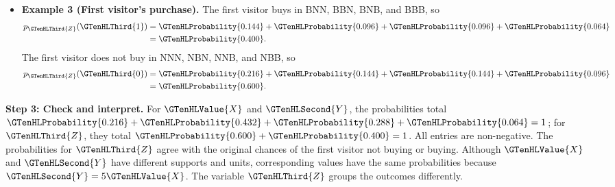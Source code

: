 \begin{itemize}
	\item \textbf{Example 3 (First visitor's purchase).}
	The first visitor buys in BNN, BBN, BNB, and BBB, so
	\[
	\begin{aligned}
		p_{\GTenHLThird{Z}}(\GTenHLThird{1})
		&=\GTenHLProbability{0.144}+\GTenHLProbability{0.096}+\GTenHLProbability{0.096}+\GTenHLProbability{0.064}\\
		&=\GTenHLProbability{0.400}.
	\end{aligned}
	\]
	The first visitor does not buy in NNN, NBN, NNB,
	and NBB, so
	\[
	\begin{aligned}
		p_{\GTenHLThird{Z}}(\GTenHLThird{0})
		&=\GTenHLProbability{0.216}+\GTenHLProbability{0.144}+\GTenHLProbability{0.144}+\GTenHLProbability{0.096}\\
		&=\GTenHLProbability{0.600}.
	\end{aligned}
	\]
\end{itemize}

\textbf{Step 3: Check and interpret.} For $\GTenHLValue{X}$ and $\GTenHLSecond{Y}$, the probabilities total $\GTenHLProbability{0.216}+\GTenHLProbability{0.432}+\GTenHLProbability{0.288}+\GTenHLProbability{0.064}=1$; for $\GTenHLThird{Z}$, they total $\GTenHLProbability{0.600}+\GTenHLProbability{0.400}=1$. All entries are non-negative. The probabilities for $\GTenHLThird{Z}$ agree with the original chances of the first visitor not buying or buying. Although $\GTenHLValue{X}$ and $\GTenHLSecond{Y}$ have different supports and units, corresponding values have the same probabilities because $\GTenHLSecond{Y}=5\GTenHLValue{X}$. The variable $\GTenHLThird{Z}$ groups the outcomes differently.


